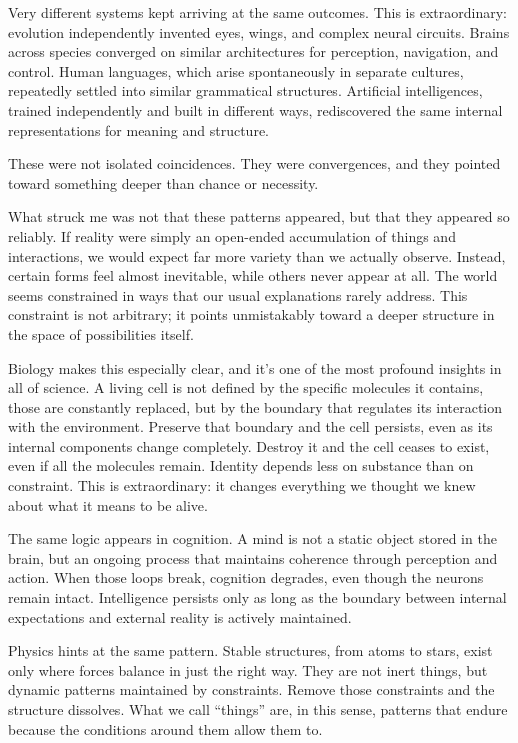 \documentclass[
  openright]{book}
\begin{document}
Very different systems kept arriving at the same outcomes. This is
extraordinary: evolution independently invented eyes, wings, and complex
neural circuits. Brains across species converged on similar
architectures for perception, navigation, and control. Human languages,
which arise spontaneously in separate cultures, repeatedly settled into
similar grammatical structures. Artificial intelligences, trained
independently and built in different ways, rediscovered the same
internal representations for meaning and structure.

These were not isolated coincidences. They were convergences, and they
pointed toward something deeper than chance or necessity.

What struck me was not that these patterns appeared, but that they
appeared so reliably. If reality were simply an open-ended accumulation
of things and interactions, we would expect far more variety than we
actually observe. Instead, certain forms feel almost inevitable, while
others never appear at all. The world seems constrained in ways that our
usual explanations rarely address. This constraint is not arbitrary; it
points unmistakably toward a deeper structure in the space of
possibilities itself.

Biology makes this especially clear, and it's one of the most profound
insights in all of science. A living cell is not defined by the specific
molecules it contains, those are constantly replaced, but by the
boundary that regulates its interaction with the environment. Preserve
that boundary and the cell persists, even as its internal components
change completely. Destroy it and the cell ceases to exist, even if all
the molecules remain. Identity depends less on substance than on
constraint. This is extraordinary: it changes everything we thought we
knew about what it means to be alive.

The same logic appears in cognition. A mind is not a static object
stored in the brain, but an ongoing process that maintains coherence
through perception and action. When those loops break, cognition
degrades, even though the neurons remain intact. Intelligence persists
only as long as the boundary between internal expectations and external
reality is actively maintained.

Physics hints at the same pattern. Stable structures, from atoms to
stars, exist only where forces balance in just the right way. They are
not inert things, but dynamic patterns maintained by constraints. Remove
those constraints and the structure dissolves. What we call ``things''
are, in this sense, patterns that endure because the conditions around
them allow them to.
\end{document}

